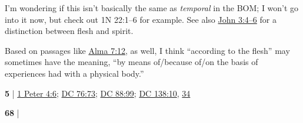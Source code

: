 	\begin{compactdesc}
		\item[according to the flesh] 
			\begin{compactdesc}
				\item[Commentary] I'm wondering if this isn't basically the same as \textit{temporal} in the BOM; I won't go into it now, but check out 1N 22:1--6 for example. See also \hyperref[LCHRIST-036-J]{John 3:4--6} for a distinction between flesh and spirit.
				\item Based on passages like \hyperref[ALMA-7-12]{Alma 7:12}, as well, I think ``according to the flesh'' may sometimes have the meaning, ``by means of/because of/on the basis of experiences had with a physical body.''
			\end{compactdesc}
		\item[according to men in the flesh] \textbf{5} | \hyperref[1PETER-4-6]{1 Peter 4:6}; \hyperref[DC76-73]{DC 76:73}; \hyperref[DC88-99]{DC 88:99}; \hyperref[DC138-10]{DC 138:10}, \hyperref[DC138-34]{34}
			\begin{compactdesc}
				\item[Bible anchor verses] \phantom{.}
					\begin{compactdesc}
						\item[1 Peter 4:6] 
					\end{compactdesc}
			\end{compactdesc}
		\item[all flesh] \textbf{68} | 
	\end{compactdesc}
	


	
